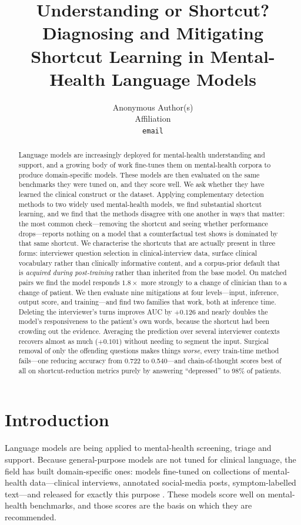 \documentclass{article}
\title{Understanding or Shortcut? Diagnosing and Mitigating\\
       Shortcut Learning in Mental-Health Language Models}
\author{%
  Anonymous Author(s)\\
  Affiliation\\
  \texttt{email}
}
\begin{document}
\maketitle

\begin{abstract}
Language models are increasingly deployed for mental-health understanding and
support, and a growing body of work fine-tunes them on mental-health corpora to
produce domain-specific models. These models are then evaluated on the same
benchmarks they were tuned on, and they score well. We ask whether they have
learned the clinical construct or the dataset. Applying complementary detection
methods to two widely used mental-health models, we find substantial shortcut
learning, and we find that the methods disagree with one another in ways that matter: the
most common check---removing the shortcut and seeing whether performance
drops---reports nothing on a model that a counterfactual test shows is dominated
by that same shortcut. We characterise the shortcuts that are actually present
in three forms: interviewer question selection in clinical-interview data,
surface clinical vocabulary rather than clinically informative content, and a
corpus-prior default that is \emph{acquired during post-training} rather than
inherited from the base model. On matched pairs we find the model responds
$1.8\times$ more strongly to a change of clinician than to a change of patient.
We then evaluate nine mitigations at four levels---input, inference, output
score, and training---and find two families that work, both at inference time.
Deleting the interviewer's turns improves AUC by $+0.126$ and nearly doubles the
model's responsiveness to the patient's own words, because the shortcut had been
crowding out the evidence. Averaging the prediction over several interviewer
contexts recovers almost as much ($+0.101$) without needing to segment the input.
Surgical removal of only the offending questions makes things \emph{worse}, every
train-time method fails---one reducing accuracy from 0.722 to 0.540---and
chain-of-thought scores best of all on shortcut-reduction metrics purely by
answering ``depressed'' to 98\% of patients.
\end{abstract}

\section{Introduction}

Language models are being applied to mental-health screening, triage and
support. Because general-purpose models are not tuned for clinical language, the
field has built domain-specific ones: models fine-tuned on collections of
mental-health data---clinical interviews, annotated social-media posts,
symptom-labelled text---and released for exactly this purpose
\citep{yang2024mentallama,ji2022mentalbert}.
These models score well on mental-health benchmarks, and those scores are the
basis on which they are recommended.
\end{document}

